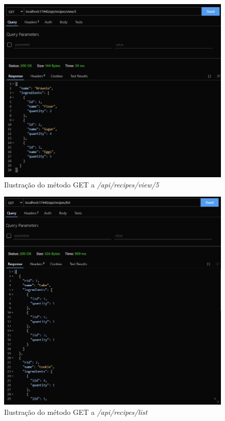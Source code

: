 \FloatBarrier
\begin{figure}[!hbt]
    \centering
    \includegraphics[width=14cm]{Resources/API/Recipes/Recipes (6).png}
    \caption{Ilustração do método GET a \textit{/api/recipes/view/5}}
    \label{fig:api_rec_6}
\end{figure}
\FloatBarrier
\begin{figure}[!hbt]
    \centering
    \includegraphics[width=14cm]{Resources/API/Recipes/Recipes (7).png}
    \caption{Ilustração do método GET a \textit{/api/recipes/list}}
    \label{fig:api_rec_7}
\end{figure}
\FloatBarrier

